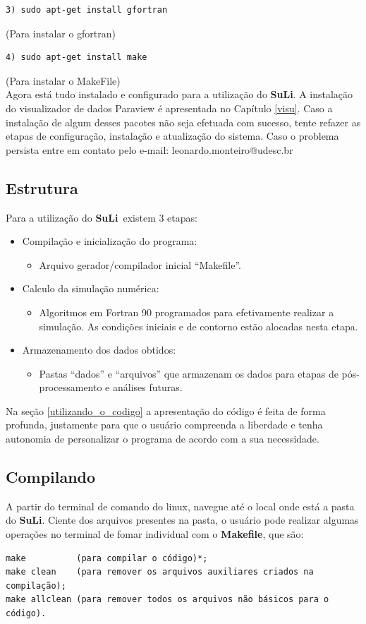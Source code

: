 \documentclass[12pt, a4paper]{article}
\newcommand{\SL}{{\bf SuLi}}
\begin{document}
\begin{verbatim}
3) sudo apt-get install gfortran
\end{verbatim}
(Para instalar o gfortran)

\begin{verbatim}
4) sudo apt-get install make
\end{verbatim}
(Para instalar o MakeFile)
\\

Agora está tudo instalado e configurado para a utilização do \SL. A instalação do visualizador de dados Paraview é apresentada no Capítulo \ref{visu}. Caso a instalação de algum desses pacotes não seja efetuada com sucesso, tente refazer as etapas de configuração, instalação e atualização do sistema. Caso o problema persista entre em contato pelo e-mail: leonardo.monteiro@udesc.br

\subsection{Estrutura}
Para a utilização do \SL\ existem 3 etapas:
\begin{itemize}
	\item Compilação e inicialização do programa:
		\begin{itemize}
			\item Arquivo gerador/compilador inicial ``Makefile''.
		\end{itemize}
	\item Calculo da simulação numérica:
		\begin{itemize}
			\item Algoritmos em Fortran 90 programados para efetivamente realizar a simulação. As condições iniciais e de contorno estão alocadas nesta etapa.
		\end{itemize}
	\item Armazenamento dos dados obtidos:
		\begin{itemize}
			\item Pastas ``dados'' e ``arquivos'' que armazenam os dados para etapas de pós-processamento e análises futuras.
		\end{itemize}
\end{itemize}
Na seção \ref{utilizando_o_codigo} a apresentação do código é feita de forma profunda, justamente para que o usuário compreenda a liberdade e tenha autonomia de personalizar o programa de acordo com a sua necessidade.


\subsection{Compilando}
A partir do terminal de comando do linux, navegue até o local onde está a pasta do \SL . Ciente dos arquivos presentes na pasta, o usuário pode realizar algumas operações no terminal de fomar individual com o {\bf{Makefile}}, que são:
\label{limpar_dados}
\begin{verbatim}
make          (para compilar o código)*; 
make clean    (para remover os arquivos auxiliares criados na compilação);
make allclean (para remover todos os arquivos não básicos para o código).
\end{verbatim} 
\end{document}
